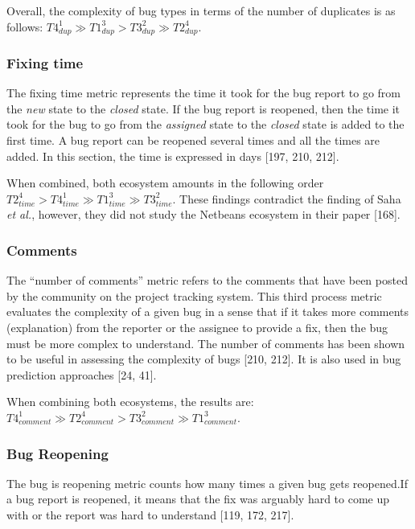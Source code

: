\documentclass[12pt]{report}
\begin{document}
Overall, the complexity of bug types in terms of the number of
duplicates is as follows:
\(T4_{dup}^{1} \gg T1_{dup}^{3} > T3_{dup}^{2} \gg T2_{dup}^{4}\).

\subsubsection{Fixing time}\label{fixing-time}

The fixing time metric represents the time it took for the bug report to
go from the \emph{new} state to the \emph{closed} state. If the bug
report is reopened, then the time it took for the bug to go from the
\emph{assigned} state to the \emph{closed} state is added to the first
time. A bug report can be reopened several times and all the times are
added. In this section, the time is expressed in days {[}197, 210,
212{]}.

When combined, both ecosystem amounts in the following order
\(T2_{time}^4 > T4_{time}^1 \gg T1_{time}^3 \gg T3_{time}^2\). These
findings contradict the finding of Saha \emph{et al.}, however, they did
not study the Netbeans ecosystem in their paper {[}168{]}.

\subsubsection{Comments}\label{comments}

The ``number of comments'' metric refers to the comments that have been
posted by the community on the project tracking system. This third
process metric evaluates the complexity of a given bug in a sense that
if it takes more comments (explanation) from the reporter or the
assignee to provide a fix, then the bug must be more complex to
understand. The number of comments has been shown to be useful in
assessing the complexity of bugs {[}210, 212{]}. It is also used in bug
prediction approaches {[}24, 41{]}.

When combining both ecosystems, the results are:
\(T4_{comment}^1 \gg T2_{comment}^4 > T3_{comment}^2 \gg T1_{comment}^3\).

\subsubsection{Bug Reopening}\label{bug-reopening}

The bug is reopening metric counts how many times a given bug gets
reopened.If a bug report is reopened, it means that the fix was arguably
hard to come up with or the report was hard to understand {[}119, 172,
217{]}.
\end{document}
